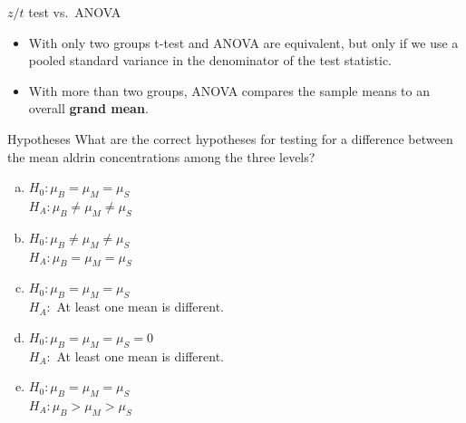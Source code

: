 \documentclass[
  ignorenonframetext,
]{beamer}
\providecommand{\tightlist}{%
  \setlength{\itemsep}{0pt}\setlength{\parskip}{0pt}}
\begin{document}
\begin{frame}{\(z/t\) test vs.~ANOVA}
\protect\hypertarget{zt-test-vs.-anova}{}
\begin{itemize}
\tightlist
\item
  With only two groups t-test and ANOVA are equivalent, but only if we
  use a pooled standard variance in the denominator of the test
  statistic.
\end{itemize}

\pause

\begin{itemize}
\tightlist
\item
  With more than two groups, ANOVA compares the sample means to an
  overall \textbf{grand mean}.
\end{itemize}
\end{frame}

\begin{frame}{Hypotheses}
\protect\hypertarget{hypotheses}{}
\alert{What are the correct hypotheses for testing for a difference between the mean aldrin concentrations among the three levels?}

\begin{enumerate}[(a)]
\item $H_0: \mu_B = \mu_M = \mu_S$ \\
$H_A: \mu_B \ne \mu_M \ne \mu_S$ \\
\item $H_0: \mu_B \ne \mu_ M \ne \mu_S$ \\
$H_A: \mu_B = \mu_M = \mu_S$ \\
\item $H_0: \mu_B = \mu_M = \mu_S$ \\
$H_A:$ At least one mean is different.
\item $H_0: \mu_B = \mu_M = \mu_S = 0$ \\
$H_A:$ At least one mean is different.
\item $H_0: \mu_B = \mu_M = \mu_S$ \\
$H_A: \mu_B > \mu_M > \mu_S$ \\
\end{enumerate}
\end{frame}
\end{document}
